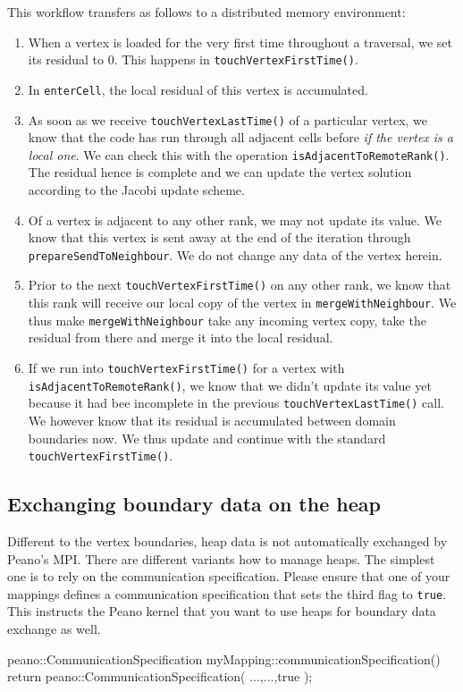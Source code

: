 \noindent
This workflow transfers as follows to a distributed memory environment:
\begin{enumerate}
  \item When a vertex is loaded for the very first time throughout a traversal,
  we set its residual to $0$. This happens in \texttt{touchVertexFirstTime()}.
  \item In \texttt{enterCell}, the local residual of this vertex is accumulated.
  \item As soon as we receive \texttt{touchVertexLastTime()} of a particular
  vertex, we know that the code has run through all adjacent cells before {\em
  if the vertex is  a local one}. We can check this with the operation
  \texttt{isAdjacentToRemoteRank()}. The residual hence is complete and we can update the
  vertex solution according to the Jacobi update scheme.
  \item Of a vertex is adjacent to any other rank, we may not update its value.
  We know that this vertex is sent away at the end of the iteration through 
  \texttt{prepareSendToNeighbour}. We do not change any data of the vertex
  herein.
  \item Prior to the next \texttt{touchVertexFirstTime()} on any other rank, we
  know that this rank will receive our local copy of the vertex in
  \texttt{mergeWithNeighbour}. We thus make \texttt{mergeWithNeighbour} take any
  incoming vertex copy, take the residual from there and merge it into the local
  residual.
  \item If we run into \texttt{touchVertexFirstTime()} for a vertex with
  \texttt{isAdjacentToRemoteRank()}, we know that we didn't update its value yet
  because it had bee incomplete in the previous \texttt{touchVertexLastTime()}
  call. We however know that its residual is accumulated between domain
  boundaries now. We thus update and continue with the standard
  \texttt{touchVertexFirstTime()}.
\end{enumerate}



\subsection{Exchanging boundary data on the heap}

Different to the vertex boundaries, heap data is not automatically exchanged by
Peano's MPI. 
There are different variants how to manage heaps. 
The simplest one is to rely on the communication specification. 
Please ensure that one of your mappings defines a communication specification
that sets the third flag to \texttt{true}.
This instructs the Peano kernel that you want to use heaps for boundary data
exchange as well.
\begin{code}
peano::CommunicationSpecification  
myMapping::communicationSpecification() { 
  return peano::CommunicationSpecification( ...,...,true );
}
\end{code}

